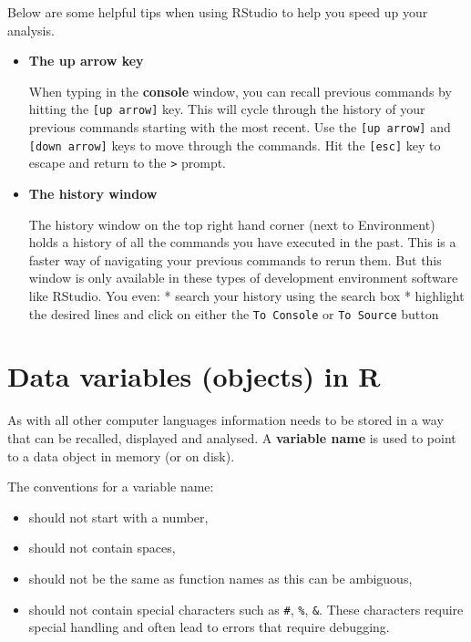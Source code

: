 \documentclass[a4paper]{book}
\providecommand{\tightlist}{%
  \setlength{\itemsep}{0pt}\setlength{\parskip}{0pt}}
\newenvironment{rmdblock}[1]
  {\vspace{1.5em}\begin{shaded*}
  \begin{itemize}
  \renewcommand{\labelitemi}{
    \raisebox{-.7\height}[0pt][0pt]{
      {\setkeys{Gin}{width=3em,keepaspectratio}\texttt{[image: images/\#1]}}
    }
  }
  \item
  }
  {
  \end{itemize}
  \end{shaded*}
  }
\newenvironment{rmdtip}
  {\begin{rmdblock}{tip}}
  {\end{rmdblock}}
\begin{document}
Below are some helpful tips when using RStudio to help you speed up your
analysis.

\begin{rmdtip}
\textbf{The up arrow key}

When typing in the \textbf{console} window, you can recall previous
commands by hitting the \texttt{{[}up\ arrow{]}} key. This will cycle
through the history of your previous commands starting with the most
recent. Use the \texttt{{[}up\ arrow{]}} and \texttt{{[}down\ arrow{]}}
keys to move through the commands. Hit the \texttt{{[}esc{]}} key to
escape and return to the \texttt{\textgreater{}} prompt.
\end{rmdtip}

\begin{rmdtip}
\textbf{The history window}

The history window on the top right hand corner (next to Environment)
holds a history of all the commands you have executed in the past. This
is a faster way of navigating your previous commands to rerun them. But
this window is only available in these types of development environment
software like RStudio. You even: * search your history using the search
box * highlight the desired lines and click on either the
\texttt{To\ Console} or \texttt{To\ Source} button
\end{rmdtip}

\chapter{Data variables (objects) in
R}\label{data-variables-objects-in-r}

As with all other computer languages information needs to be stored in a
way that can be recalled, displayed and analysed. A \textbf{variable
name} is used to point to a data object in memory (or on disk).

The conventions for a variable name:

\begin{itemize}
\tightlist
\item
  should not start with a number,
\item
  should not contain spaces,
\item
  should not be the same as function names as this can be ambiguous,
\item
  should not contain special characters such as \texttt{\#},
  \texttt{\%}, \texttt{\&}. These characters require special handling
  and often lead to errors that require debugging.
\end{itemize}
\end{document}
